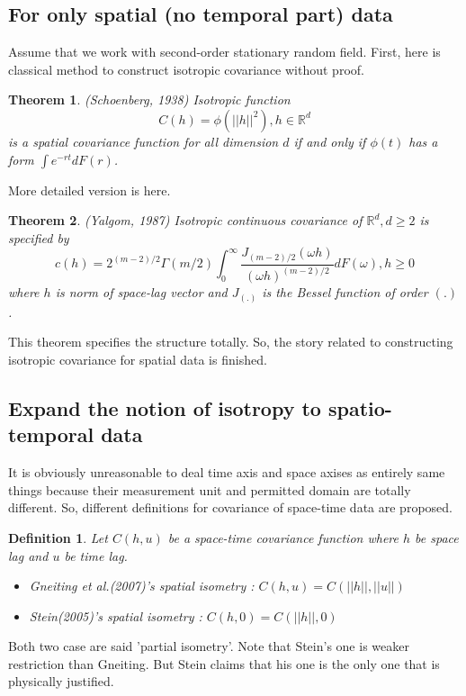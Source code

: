 \documentclass{article}
\newtheorem*{theorem}{Theorem}
\newtheorem*{definition}{Definition}
\begin{document}
\subsection{For only spatial (no temporal part) data}
Assume that we work with second-order stationary random field.
First, here is classical method to construct isotropic covariance without proof.
\begin{theorem}{(Schoenberg, 1938)}
    Isotropic function
    \[C(h)=\phi(||h||^2),h\in\mathbb R^d\]
    is a spatial covariance function for all dimension $d$ if and only if $\phi(t)$ has a form $\int e^{-rt}dF(r)$.
\end{theorem}
More detailed version is here.
\begin{theorem}{(Yalgom, 1987)}
    Isotropic continuous covariance of $\mathbb R^d, d\geq 2$ is specified by
    \[c(h)=2^{(m-2)/2} \Gamma(m/2) \int_0^\infty \frac{J_{(m-2)/2}(\omega h)}{(\omega h)^{(m-2)/2}}dF(\omega), h\geq 0\]
    where $h$ is norm of space-lag vector and $J_(.)$ is the Bessel function of order $(.)$.
\end{theorem}
This theorem specifies the structure totally. So, the story related to constructing isotropic covariance for spatial data is finished.



\subsection{Expand the notion of isotropy to spatio-temporal data}
It is obviously unreasonable to deal time axis and space axises as entirely same things because their measurement unit and permitted domain are totally different.
So, different definitions for covariance of space-time data are proposed. 

\begin{definition}
    Let $C(h,u)$ be a space-time covariance function where $h$ be space lag and $u$ be time lag.
    \begin{itemize}
        \item Gneiting et al.(2007)'s spatial isometry : $C(h,u)=C(||h||,||u||)$
        \item Stein(2005)'s spatial isometry : $C(h,0)=C(||h||,0)$
    \end{itemize}    
\end{definition}
Both two case are said 'partial isometry'.
Note that Stein's one is weaker restriction than Gneiting. But Stein claims that his one is the only one that is physically justified.
\end{document}
